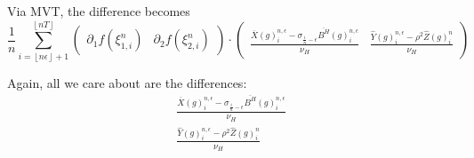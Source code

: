 \documentclass[12pt,letterpaper]{article}
\theoremstyle{lemma}
\theoremstyle{definition}
\begin{document}
Via MVT, the difference becomes
\begin{equation}
  \frac{1}{n}\sum_{i=\left\lfloor n\epsilon \right\rfloor + 1}^{\left\lfloor nT \right\rfloor} \begin{pmatrix} \partial_1 f(\xi_{1,i}^n) & \partial_2 f(\xi_{2,i}^n) \end{pmatrix} \cdot \begin{pmatrix} \frac{\overline{X}(g)^{n,\epsilon}_i - \sigma_{\frac{i}{n}-\epsilon}\overline{B^H}(g)^{n,\epsilon}_i}{\nu_H} & \frac{\widehat{Y}(g)^{n,\epsilon}_i - \rho^2\widehat{Z}(g)^{n}_i}{\nu_H} \end{pmatrix}
\end{equation}

Again, all we care about are the differences:
\begin{gather}
  \frac{\overline{X}(g)^{n,\epsilon}_i - \sigma_{\frac{i}{n}-\epsilon}\overline{B^H}(g)^{n,\epsilon}_i}{\nu_H} \\
  \frac{\widehat{Y}(g)^{n,\epsilon}_i - \rho^2\widehat{Z}(g)^{n}_i}{\nu_H}
\end{gather}
\end{document}
